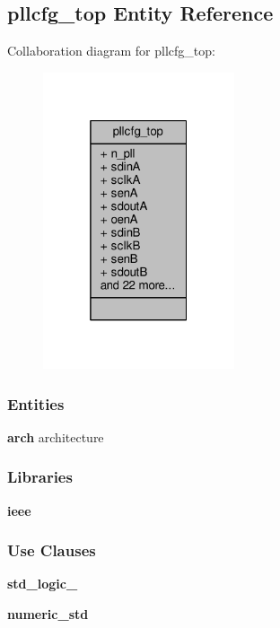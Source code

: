\subsection{pllcfg\+\_\+top Entity Reference}
\label{classpllcfg__top}


Collaboration diagram for pllcfg\+\_\+top\+:\nopagebreak
\begin{figure}[H]
\begin{center}
\leavevmode
\includegraphics[width=160pt]{dc/db8/classpllcfg__top__coll__graph}
\end{center}
\end{figure}
\subsubsection*{Entities}
\begin{DoxyCompactItemize}
\item 
{\bf arch} architecture
\end{DoxyCompactItemize}
\subsubsection*{Libraries}
 \begin{DoxyCompactItemize}
\item 
{\bf ieee} 
\end{DoxyCompactItemize}
\subsubsection*{Use Clauses}
 \begin{DoxyCompactItemize}
\item 
{\bf std\+\_\+logic\+\_}   
\item 
{\bf numeric\+\_\+std}   
\end{DoxyCompactItemize}
